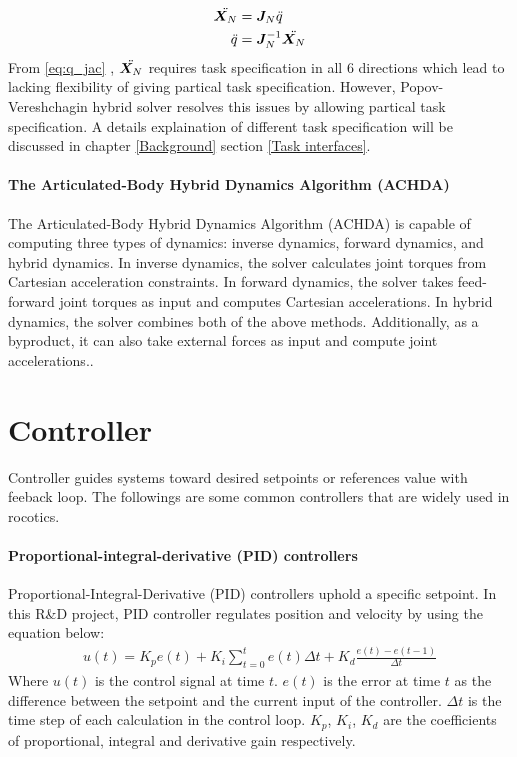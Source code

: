 \documentclass[report.tex]{subfiles}
\begin{document}
    \begin{align}
        \ddot{\bm{X_}N} &= \bm{J}_N \ddot{q}\\
        \label{eq:q_jac} \ddot{q} &= \bm{J}_N^{-1} \ddot{\bm{X_}N}
    \end{align}
    From \ref{eq:q_jac} , $\ddot{\bm{X_}N}$ requires task specification in all 6 directions which lead to lacking flexibility of giving partical task specification. However,  Popov-Vereshchagin hybrid solver resolves this issues by allowing partical task specification. A details explaination of different task specification will be discussed in chapter \ref{Background} section \ref{Task interfaces}.

    \paragraph*{\large{The Articulated-Body Hybrid Dynamics Algorithm (ACHDA)}\\}
    The Articulated-Body Hybrid Dynamics Algorithm (ACHDA) is capable of computing three types of dynamics: inverse dynamics, forward dynamics, and hybrid dynamics. In inverse dynamics, the solver calculates joint torques from Cartesian acceleration constraints. In forward dynamics, the solver takes feed-forward joint torques as input and computes Cartesian accelerations. In hybrid dynamics, the solver combines both of the above methods. Additionally, as a byproduct, it can also take external forces as input and compute joint accelerations.\cite{featherstone2007book}.

    \section{Controller}
    \label{Controller}
    Controller guides systems toward desired setpoints or references value with feeback loop. The followings are some common controllers that are widely used in rocotics.
    \paragraph*{\large{Proportional-integral-derivative (PID) controllers}\\}
    Proportional-Integral-Derivative (PID) controllers uphold a specific setpoint. In this R\&D project, PID controller regulates position and velocity by using the equation below:
    \begin{align}
        u(t) = K_pe(t) + K_i\sum_{t=0}^{t} e(t) \Delta{t} + K_d \frac{e(t)-e(t-1)}{\Delta{t}}
    \end{align}
    Where $u(t)$ is the control signal at time $t$. $e(t)$ is the error at time $t$ as the difference between the setpoint and the current input of the controller. $\Delta{t}$ is the time step of each calculation in the control loop. $K_p$, $K_i$, $K_d$ are the coefficients of proportional, integral and derivative gain respectively\cite{johnson2005pid}.
\end{document}
